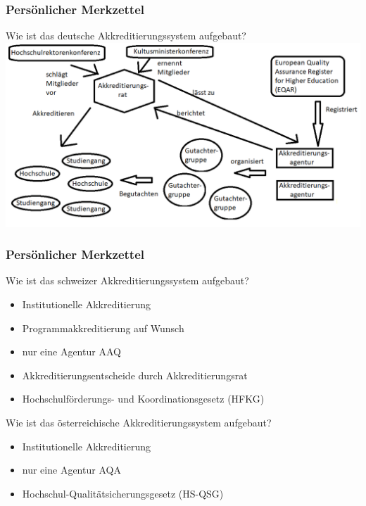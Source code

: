 \documentclass[german,10pt,xcolor=colortbl,compress]{beamer}
\begin{document}
\begin{frame}
\frametitle{Persönlicher Merkzettel}
Wie ist das deutsche Akkreditierungssystem aufgebaut?
\vspace{0.5cm}
  \includegraphics[width=1\textwidth]{Schaubild2.png}
\end{frame}
\begin{frame}
\frametitle{Persönlicher Merkzettel}
Wie ist das schweizer Akkreditierungssystem aufgebaut?
\begin{itemize}
\item Institutionelle Akkreditierung
\item Programmakkreditierung auf Wunsch
\item nur eine Agentur AAQ
\item Akkreditierungsentscheide durch Akkreditierungsrat
\item Hochschulförderungs- und Koordinationsgesetz (HFKG)
\end{itemize}
\pause
Wie ist das österreichische Akkreditierungssystem aufgebaut?
\begin{itemize}
\item Institutionelle Akkreditierung
\item nur eine Agentur AQA
\item Hochschul-Qualitätsicherungsgesetz (HS-QSG)
\end{itemize}
\end{frame}
\end{document}
